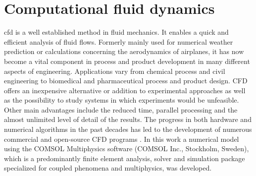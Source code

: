 % 
% 
% 

\section{Computational fluid dynamics}
\label{sec:CFD}
\Gls{cfd} is a well established method in fluid mechanics. It enables a quick and efficient analysis of fluid flows. Formerly mainly used for numerical weather prediction or calculations concerning the aerodynamics of airplanes, it has now become a vital component in process and
product development in many different aspects of engineering. Applications vary from chemical process and civil engineering to biomedical and pharmaceutical
process and product design. CFD offers an inexpensive alternative or addition to experimental approaches as well as the possibility to study systems in which experiments would be unfeasible. Other main advantages include the reduced time, parallel processing and the almost unlimited level of detail of the results. The progress in both hardware and numerical algorithms in the past decades has led to the development of numerous commercial and open-source CFD programs \cite{ghia1982high}. In this work a numerical model using the COMSOL Multiphysics  software (COMSOL Inc., Stockholm, Sweden), which is a predominantly finite element analysis, solver and simulation package specialized for coupled phenomena and multiphysics, was developed.

